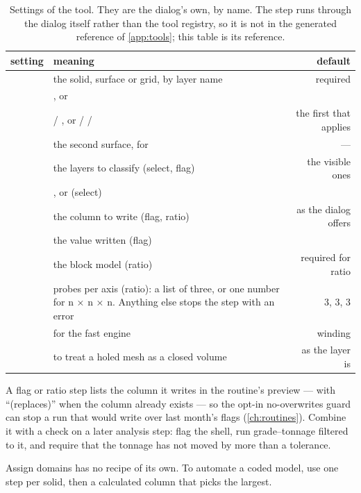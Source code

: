 \begin{table}[htbp]\small
\begin{tabularx}{\linewidth}{@{}lMD@{}}\toprule
setting & meaning & default \\ \midrule
{} & the solid, surface or grid, by layer name & required \\
 & ,  or  &  \\
 &  / , or  /  /  & the first that applies \\
 & the second surface, for  & — \\
 & the layers to classify (select, flag) & the visible ones \\
 & ,  or  (select) &  \\
 & the column to write (flag, ratio) & as the dialog offers \\
 & the value written (flag) &  \\
 & the block model (ratio) & required for ratio \\
 & probes per axis (ratio): a list of three, or one number  for n × n × n. Anything else stops the step with an error & 3, 3, 3 \\
 &  for the fast engine & winding \\
 &  to treat a holed mesh as a closed volume & as the layer is \\ \bottomrule
\end{tabularx}
\caption{Settings of the  tool. They are the dialog's own, by name. The step runs through the dialog itself rather than the tool registry, so it is not in the generated reference of \cref{app:tools}; this table is its reference.}\label{tab:geometry-tool}
\end{table}

A flag or ratio step lists the column it writes in the routine's preview — with “(replaces)” when the column already exists — so the opt-in no-overwrites guard can stop a run that would write over last month's flags (\cref{ch:routines}). Combine it with a check on a later analysis step: flag the shell, run grade–tonnage filtered to it, and require that the tonnage has not moved by more than a tolerance.

Assign domains has no recipe of its own. To automate a coded model, use one  step per solid, then a calculated column that picks the largest.
